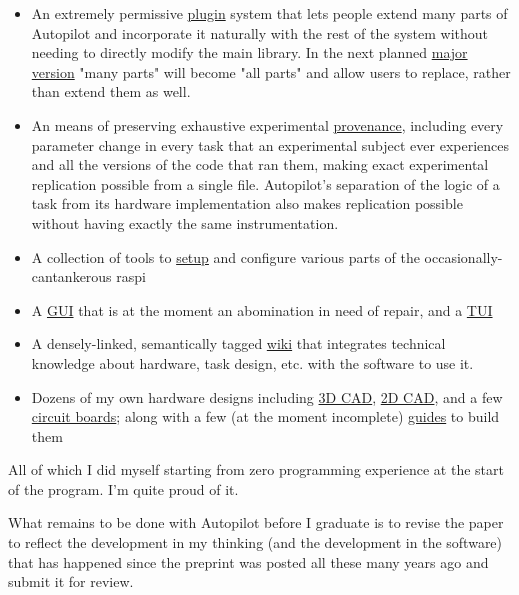 \begin{done}
\begin{itemize}
\item An extremely permissive \href{https://docs.auto-pi-lot.com/en/latest/guide/plugins.html}{plugin} system that lets people extend many parts of Autopilot and incorporate it naturally with the rest of the system without needing to directly modify the main library. In the next planned \href{https://github.com/wehr-lab/autopilot/milestone/2}{major version} "many parts" will become "all parts" and allow users to replace, rather than extend them as well.
\item An means of preserving exhaustive experimental \href{https://docs.auto-pi-lot.com/en/latest/core/subject.html}{provenance}, including every parameter change in every task that an experimental subject ever experiences and all the versions of the code that ran them, making exact experimental replication possible from a single file. Autopilot's separation of the logic of a task from its hardware implementation also makes replication possible without having exactly the same instrumentation.
\item A collection of tools to \href{https://docs.auto-pi-lot.com/en/latest/setup/index.html}{setup} and configure various parts of the occasionally-cantankerous raspi
\item A \href{https://docs.auto-pi-lot.com/en/latest/core/terminal.html}{GUI} that is at the moment an abomination in need of repair, and a \href{https://docs.auto-pi-lot.com/en/latest/guide/installation.html#configuration}{TUI}
\item A densely-linked, semantically tagged \href{https://wiki.auto-pi-lot.com/index.php/Autopilot_Wiki}{wiki} that integrates technical knowledge about hardware, task design, etc. with the software to use it. 
\item Dozens of my own hardware designs including \href{https://wiki.auto-pi-lot.com/index.php/3D_CAD}{3D CAD}, \href{https://wiki.auto-pi-lot.com/index.php/2D_CAD}{2D CAD}, and a few \href{https://wiki.auto-pi-lot.com/index.php/PCBs}{circuit boards}; along with a few (at the moment incomplete) \href{https://wiki.auto-pi-lot.com/index.php/Guides}{guides} to build them
\end{itemize}

\end{done}

All of which I did myself starting from zero programming experience at the start of the program. I'm quite proud of it.

\begin{todo}
What remains to be done with Autopilot before I graduate is to revise the paper to reflect the development in my thinking (and the development in the software) that has happened since the preprint was posted all these many years ago and submit it for review. 
\end{todo}


